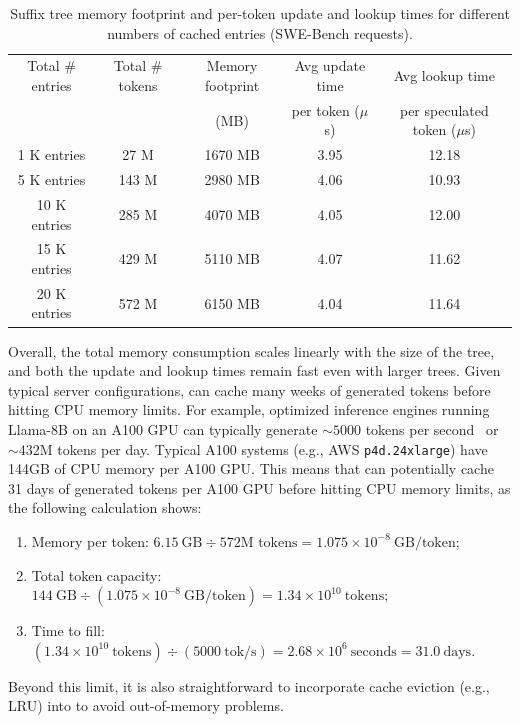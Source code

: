 \begin{table}[htbp]
\centering
\caption{Suffix tree memory footprint and per-token update and lookup times for different numbers of cached entries (SWE-Bench requests).}
\label{suffixdecoding:tab:scalability}
\small
\begin{tabular}{ccccc}
\toprule
Total \# entries & Total \# tokens & Memory footprint & Avg update time & Avg lookup time \\
                 &                 & (MB)             & per token ($\mu$s)  & per speculated token ($\mu$s) \\
\midrule
1 K entries & 27 M & 1670 MB & 3.95 & 12.18 \\
5 K entries & 143 M & 2980 MB & 4.06 & 10.93 \\
10 K entries & 285 M & 4070 MB & 4.05 & 12.00 \\
15 K entries & 429 M & 5110 MB & 4.07 & 11.62 \\
20 K entries & 572 M & 6150 MB & 4.04 & 11.64 \\
\bottomrule
\end{tabular}
\end{table}

Overall, the total memory consumption scales linearly with the size of the tree, and both the update and lookup times remain fast even with larger trees. Given typical server configurations, \SuffixDecoding can cache many weeks of generated tokens before hitting CPU memory limits. For example, optimized inference engines running Llama-8B on an A100 GPU can typically generate $\sim 5000$ tokens per second~\citep{yin2024sglang} or $\sim 432$M tokens per day. Typical A100 systems (e.g., AWS \texttt{p4d.24xlarge}) have 144GB of CPU memory per A100 GPU. This means that \SuffixDecoding can potentially cache 31 days of generated tokens per A100 GPU before hitting CPU memory limits, as the following calculation shows:
\begin{enumerate}
    \item Memory per token: $6.15~\text{GB} \div 572\text{M tokens} = 1.075 \times 10^{-8}~\text{GB/token}$;
    \item Total token capacity: $144~\text{GB} \div (1.075 \times 10^{-8}~\text{GB/token}) = 1.34 \times 10^{10}~\text{tokens}$;
    \item Time to fill: $(1.34 \times 10^{10}~\text{tokens}) \div (5000~\text{tok/s}) = 2.68 \times 10^{6}~\text{seconds} = 31.0~\text{days}$.
\end{enumerate}
Beyond this limit, it is also straightforward to incorporate cache eviction (e.g., LRU) into \SuffixDecoding to avoid out-of-memory problems.

